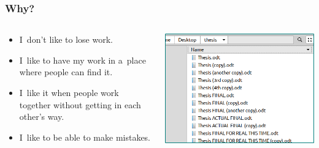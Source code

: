 \documentclass[12pt]{beamer}
\begin{document}
\begin{frame}
  \frametitle{Why?}

  \begin{columns}
    \begin{column}{.5\textwidth}
      \begin{itemize}
        \item I~don't like to lose work.
        \item I~like to have my work in a~place where people can find it.
        \item I~like it when people work together without getting in each other's
          way.
        \item I~like to be able to make mistakes.
      \end{itemize}
    \end{column}

    \begin{column}{.5\textwidth}
      \includegraphics[width=\textwidth]{images/backups.png}%
    \end{column}
  \end{columns}
\end{frame}
\end{document}
